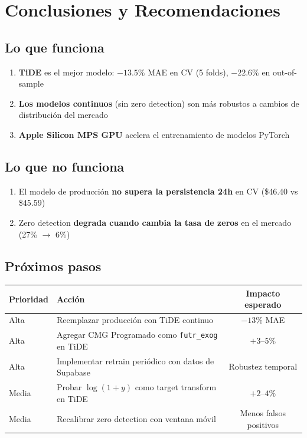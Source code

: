 \documentclass[11pt,a4paper]{article}
\begin{document}
\section{Conclusiones y Recomendaciones}
\label{sec:conclusiones}

\subsection{Lo que funciona}
\begin{enumerate}
    \item \textbf{TiDE} es el mejor modelo: $-13.5\%$ MAE en CV (5 folds), $-22.6\%$ en out-of-sample
    \item \textbf{Los modelos continuos} (sin zero detection) son m\'as robustos a cambios de distribuci\'on del mercado
    \item \textbf{Apple Silicon MPS GPU} acelera el entrenamiento de modelos PyTorch
\end{enumerate}

\subsection{Lo que no funciona}
\begin{enumerate}
    \item El modelo de producci\'on \textbf{no supera la persistencia 24h} en CV (\$46.40 vs \$45.59)
    \item Zero detection \textbf{degrada cuando cambia la tasa de zeros} en el mercado (27\% $\to$ 6\%)
\end{enumerate}

\subsection{Pr\'oximos pasos}
\begin{table}[H]
\centering
\begin{tabular}{llc}
\toprule
\textbf{Prioridad} & \textbf{Acci\'on} & \textbf{Impacto esperado} \\
\midrule
Alta & Reemplazar producci\'on con TiDE continuo & $-13\%$ MAE \\
Alta & Agregar CMG Programado como \texttt{futr\_exog} en TiDE & $+3$--$5\%$ \\
Alta & Implementar retrain peri\'odico con datos de Supabase & Robustez temporal \\
Media & Probar $\log(1+y)$ como target transform en TiDE & $+2$--$4\%$ \\
Media & Recalibrar zero detection con ventana m\'ovil & Menos falsos positivos \\
\bottomrule
\end{tabular}
\end{table}
\end{document}
